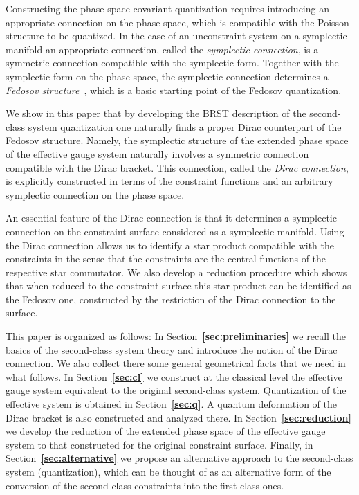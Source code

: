 \documentclass[a4paper,11pt]{amsart}
\numberwithin{thm}{section} %
\numberwithin{equation}{section} %
\numberwithin{figure}{section} %
\providecommand{\bref}[1]{{\bf \ref{#1}}}
\renewcommand{\:}{{\rm\, :\,}}
\begin{document}
Constructing the phase space covariant quantization requires
introducing an appropriate connection on the phase space, which is
compatible with the Poisson structure to be quantized.  In the
case of an unconstraint system on a symplectic manifold
an appropriate connection, called the \textit{symplectic connection},
is a symmetric connection compatible with the symplectic form.
Together with the symplectic form on the phase space, the symplectic
connection determines a \textit{Fedosov structure}~\cite{[GRS]},
which is a basic starting point of the Fedosov quantization.


We show in this paper that by developing the BRST description of the
second-class system quantization one naturally finds a proper
Dirac counterpart of the Fedosov structure.  Namely, the symplectic
structure of the extended phase space of the effective gauge system
naturally involves a symmetric connection compatible with the Dirac
bracket.  This connection, called the \textit{Dirac connection},
is explicitly constructed in terms of the constraint functions
and an arbitrary symplectic connection on the phase space.


An essential feature of the Dirac connection is that
it determines a symplectic connection on the constraint
surface considered as a symplectic manifold.
Using the Dirac connection allows us to identify a star product
compatible with the constraints in the sense that the constraints are
the central functions of the respective star commutator.
We also develop a reduction procedure which shows
that when reduced to the constraint surface this star product
can be identified as the Fedosov one, constructed by the restriction
of the Dirac connection to the surface.



This paper is organized as follows: In Section~\bref{sec:preliminaries}
we recall the basics of the second-class system theory and introduce
the notion of the Dirac connection. We also collect there some general
geometrical facts that we need in what follows. In
Section~\bref{sec:cl} we construct at the
classical level the effective gauge system
equivalent to the original second-class system.
Quantization of the effective system is obtained
in Section~\bref{sec:q}. A quantum deformation of
the Dirac bracket is also constructed and analyzed there.
In Section~\bref{sec:reduction} we develop
the reduction of the extended phase space of the effective gauge
system to that constructed for the original constraint surface.
Finally, in Section~\bref{sec:alternative} we propose an alternative
approach to the second-class system (quantization), which can be
thought of as an alternative form of the conversion of the second-class
constraints into the first-class ones.
\end{document}
